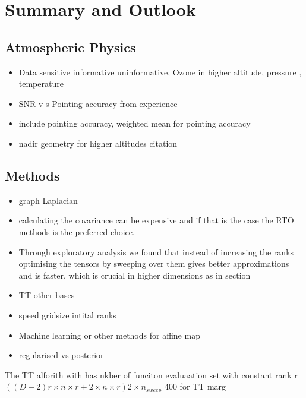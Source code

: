\chapter{Summary and Outlook}
\label{ch:SumOut}

\section{Atmospheric Physics}
\begin{itemize}
	\item Data sensitive informative uninformative, Ozone in higher altitude, pressure , temperature
	\item SNR v s Pointing accuracy from experience
	\item include pointing accuracy, weighted mean for pointing accuracy
	\item nadir geometry for higher altitudes citation
\end{itemize}

\section{Methods}
\begin{itemize}
	\item graph Laplacian
	\item calculating the covariance can be expensive and if that is the case the RTO methods is the preferred choice.
	\item Through exploratory analysis we found that instead of increasing the ranks optimising the tensors by sweeping over them gives better approximations and is faster, which is crucial in higher dimensions as in section
	\item TT other bases
	\item speed gridsize intital ranks
	\item Machine learning or other methods for affine map
	\item regularised vs posterior
\end{itemize}

The TT alforith with has nkber of funciton evaluaation set with constant rank r 
$( (D-2) r \times n\times r + 2  \times n \times r)2 \times n_{sweep}$
400 for TT marg